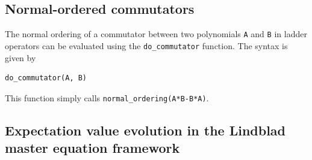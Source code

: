 \documentclass[5p, twocolumn, 10pt, sort&compress]{elsarticle}
\newcounter{bla}
\newcommand{\inlinecode}[1]{\texttt{#1}}
\begin{document}

\subsection{Normal-ordered commutators}
\label{subsec_commutators}

The normal ordering of a commutator between two polynomials \inlinecode{A} and \inlinecode{B} in ladder operators can be evaluated using the \inlinecode{do_commutator} function.  The syntax is given by
\begin{verbatim}
do_commutator(A, B)
\end{verbatim}
This function simply calls \inlinecode{normal_ordering(A*B-B*A)}. 

\subsection{Expectation value evolution in the Lindblad master equation framework}
\end{document}
